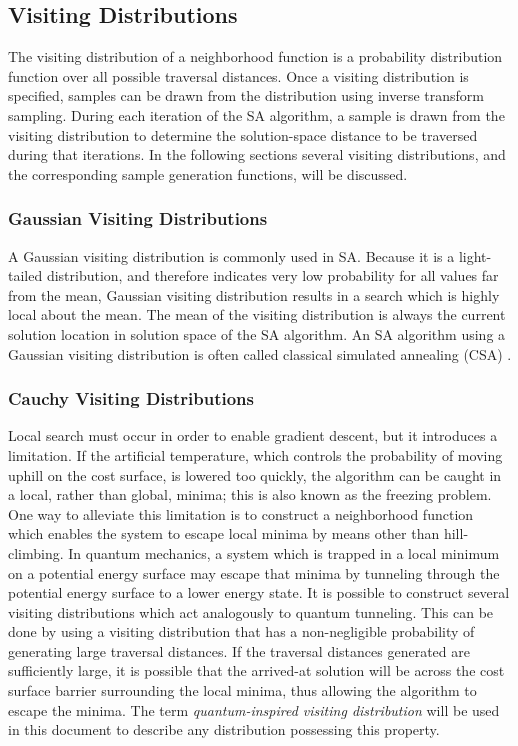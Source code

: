 \documentclass[11pt]{afthesis}
\begin{document}
	
	\subsection{Visiting Distributions}
	
	The visiting distribution of a neighborhood function is a probability distribution function over all possible traversal distances. Once a visiting distribution is specified, samples can be drawn from the distribution using inverse transform sampling. During each iteration of the SA algorithm, a sample is drawn from the visiting distribution to determine the solution-space distance to be traversed during that iterations. In the following sections several visiting distributions, and the corresponding sample generation functions, will be discussed.
	
	
	\subsubsection{Gaussian Visiting Distributions}
	\label{scn:classical_visiting}
	
	A Gaussian visiting distribution is commonly used in SA. Because it is a light-tailed distribution, and therefore indicates very low probability for all values far from the mean, Gaussian visiting distribution results in a search which is highly local about the mean. The mean of the visiting distribution is always the current solution location in solution space of the SA algorithm. An SA algorithm using a Gaussian visiting distribution is often called classical simulated annealing (CSA) \cite{tsallis1996generalizedsimulatedannealing}. 
	
	\subsubsection{Cauchy Visiting Distributions}
	
	Local search must occur in order to enable gradient descent, but it introduces a limitation. If the artificial temperature, which controls the probability of moving uphill on the cost surface, is lowered too quickly, the algorithm can be caught in a local, rather than global, minima; this is also known as the freezing problem. One way to alleviate this limitation is to construct a neighborhood function which enables the system to escape local minima by means other than hill-climbing. In quantum mechanics, a system which is trapped in a local minimum on a potential energy surface may escape that minima by tunneling through the potential energy surface to a lower energy state. It is possible to construct several visiting distributions which act analogously to quantum tunneling. This can be done by using a visiting distribution that has a non-negligible probability of generating large traversal distances. If the traversal distances generated are sufficiently large, it is possible that the arrived-at solution will be across the cost surface barrier surrounding the local minima, thus allowing the algorithm to escape the minima. The term \textit{quantum-inspired visiting distribution} will be used in this document to describe any distribution possessing this property.
	
\end{document}
